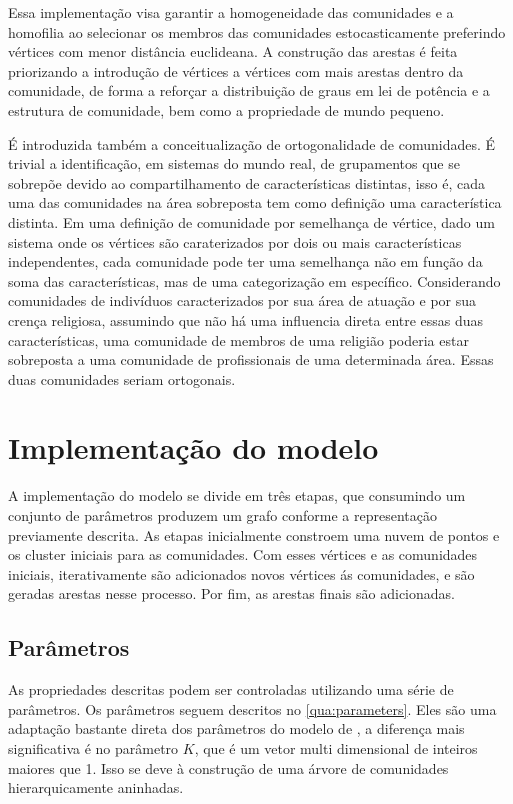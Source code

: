 \documentclass[notes.tex]{subfiles}
\begin{document}
Essa implementação visa garantir a homogeneidade das comunidades e a homofilia ao selecionar os membros das comunidades estocasticamente preferindo vértices com menor distância euclideana.
A construção das arestas é feita priorizando a introdução de vértices a vértices com mais arestas dentro da comunidade, de forma a reforçar a distribuição de graus em lei de potência e a estrutura de comunidade, bem como a propriedade de mundo pequeno.

É introduzida também a conceitualização de ortogonalidade de comunidades.
É trivial a identificação, em sistemas do mundo real, de grupamentos que se sobrepõe devido ao compartilhamento de características distintas, isso é, cada uma das comunidades na área sobreposta tem como definição uma característica distinta.
Em uma definição de comunidade por semelhança de vértice, dado um sistema onde os vértices são caraterizados por dois ou mais características independentes, cada comunidade pode ter uma semelhança não em função da soma das características, mas de uma categorização em específico.
Considerando comunidades de indivíduos caracterizados por sua área de atuação e por sua crença religiosa, assumindo que não há uma influencia direta entre essas duas características, uma comunidade de membros de uma religião poderia estar sobreposta a uma comunidade de profissionais de uma determinada área.
Essas duas comunidades seriam ortogonais.

\section{Implementação do modelo}

A implementação do modelo se divide em três etapas, que consumindo um conjunto de parâmetros produzem um grafo conforme a representação previamente descrita.
As etapas inicialmente constroem uma nuvem de pontos e os cluster iniciais para as comunidades.
Com esses vértices e as comunidades iniciais, iterativamente são adicionados novos vértices ás comunidades, e são geradas arestas nesse processo.
Por fim, as arestas finais são adicionadas.

\subsection{Parâmetros}

As propriedades descritas podem ser controladas utilizando uma série de parâmetros.
Os parâmetros seguem descritos no \autoref{qua:parameters}.
Eles são uma adaptação bastante direta dos parâmetros do modelo de , a diferença mais significativa é no parâmetro $K$, que é um vetor multi dimensional de inteiros maiores que 1.
Isso se deve à construção de uma árvore de comunidades hierarquicamente aninhadas.
\end{document}
